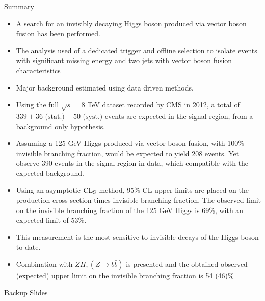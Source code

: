 \documentclass[8pt]{beamer}
\newcommand{\stat}{\text{ (stat.)}}
\newcommand{\syst}{\text{ (syst.)}}
\begin{document}
\begin{frame}{Summary}

\begin{block}

\begin{itemize}
 \item A search for an invisibly decaying Higgs boson produced via vector boson fusion has been performed. 
 \item The analysis used of a dedicated trigger and offline selection to isolate events with significant missing energy and two jets with vector boson fusion characteristics
 \item Major background estimated using data driven methods.  
 \item Using the full $\sqrt{s}=8$ TeV dataset recorded by CMS in 2012, a total of $339 \pm 36 \stat \pm 50 \syst$ events are expected in the signal region, from a background only hypothesis.  
 \item Assuming a 125 GeV Higgs produced via vector boson fusion, with 100\% invisible branching fraction, would be expected to yield 208 events. Yet observe 390 events in the signal region in data, which compatible with the expected background.
 \item Using an asymptotic ${\rm CL}_{\rm S}$ method, 95\% CL upper limits are placed on the production cross section times invisible branching fraction.  The observed limit on the invisible branching fraction of the 125 GeV Higgs is 69\%, with an expected limit of 53\%.  
 \item This measurement is the most sensitive to invisible decays of the Higgs boson to date.
 \item Combination with $ZH, (Z \rightarrow b\bar{b})$ is presented and the obtained observed (expected) upper limit on the invisible branching fraction is 54 (46)\%
\end{itemize}

\end{block}

\end{frame}

\appendix
\begin{frame}
 
\begin{block}

\begin{center}Backup Slides\end{center}

\end{block}

\end{frame}
\end{document}
